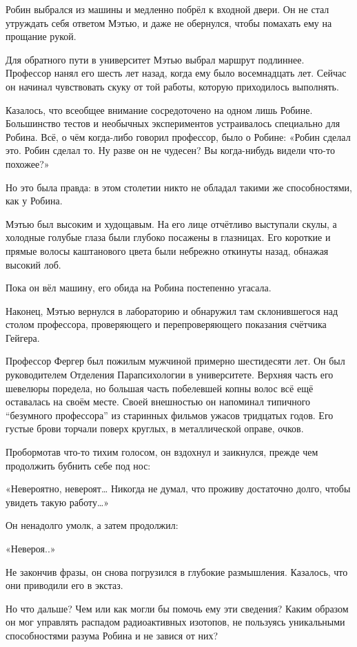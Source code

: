 \documentclass[a5paper, 9pt,
final, openany, twoside=true]{memoir}
\begin{document}
Робин выбрался из машины и медленно побрёл к входной двери. Он не стал утруждать себя ответом Мэтью, и даже не обернулся, чтобы помахать ему на прощание рукой.\bigskip

Для обратного пути в университет Мэтью выбрал маршрут подлиннее. Профессор нанял его шесть лет назад, когда ему было восемнадцать лет. Сейчас он начинал чувствовать скуку от той работы, которую приходилось выполнять.

Казалось, что всеобщее внимание сосредоточено на одном лишь Робине. Большинство тестов и необычных экспериментов устраивалось специально для Робина. Всё, о чём когда-либо говорил профессор, было о Робине: «Робин сделал это. Робин сделал то. Ну разве он не чудесен? Вы когда-нибудь видели что-то похожее?»

Но это была правда: в этом столетии никто не обладал такими же способностями, как у Робина.\bigskip

Мэтью был высоким и худощавым. На его лице отчётливо выступали скулы, а холодные голубые глаза были глубоко посажены в глазницах. Его короткие и прямые волосы каштанового цвета были небрежно откинуты назад, обнажая высокий лоб.

Пока он вёл машину, его обида на Робина постепенно угасала.\bigskip

Наконец, Мэтью вернулся в лабораторию и обнаружил там склонившегося над столом профессора, проверяющего и перепроверяющего показания счётчика Гейгера.

Профессор Фергер был пожилым мужчиной примерно шестидесяти лет. Он был руководителем Отделения Парапсихологии в университете. Верхняя часть его шевелюры поредела, но большая часть побелевшей копны волос всё ещё оставалась на своём месте. Своей внешностью он напоминал типичного ``безумного профессора'' из старинных фильмов ужасов тридцатых годов. Его густые брови торчали поверх круглых, в металлической оправе, очков.

Пробормотав что-то тихим голосом, он вздохнул и заикнулся, прежде чем продолжить бубнить себе под нос:

«Невероятно, невероят… Никогда не думал, что проживу достаточно долго, чтобы увидеть такую работу…»

Он ненадолго умолк, а затем продолжил:

«Невероя..»

Не закончив фразы, он снова погрузился в глубокие размышления. Казалось, что они приводили его в экстаз.

Но что дальше? Чем или как могли бы помочь ему эти сведения? Каким образом он мог управлять распадом радиоактивных изотопов, не пользуясь уникальными способностями разума Робина и не завися от них?
\end{document}
